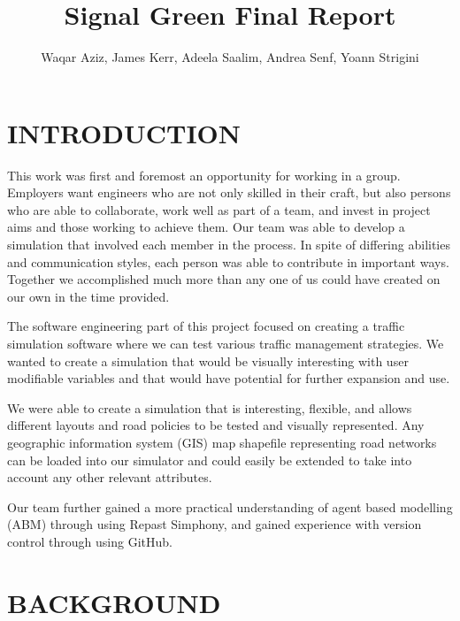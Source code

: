 \documentclass[11pt]{article}
\begin{document}
\title{Signal Green Final Report}

\author{Waqar Aziz, James Kerr, Adeela Saalim, Andrea Senf, Yoann Strigini}

\maketitle 

\newpage





\tableofcontents
{}




\newpage


\section{INTRODUCTION}


This work was first and foremost an opportunity for working in a group. Employers want engineers who are not only skilled in their craft, but also persons who are able to collaborate, work well as part of a team, and invest in project aims and those working to achieve them. Our team was able to develop a simulation that involved each member in the process. In spite of differing abilities and communication styles, each person was able to contribute in important ways. Together we accomplished much more than any one of us could have created on our own in the time provided.

The software engineering part of this project focused on creating a traffic simulation software where we can test various traffic management strategies. We wanted to create a simulation that would be visually interesting with user modifiable variables and that would have potential for further expansion and use.

We were able to create a simulation that is interesting, flexible, and allows different layouts and road policies to be tested and visually represented. Any geographic information system (GIS) map shapefile representing road networks can be loaded into our simulator and could easily be extended to take into account any other relevant attributes.

Our team further gained a more practical understanding of agent based modelling (ABM) through using Repast Simphony, and gained experience with version control through using GitHub.



\section{BACKGROUND}
\end{document}
